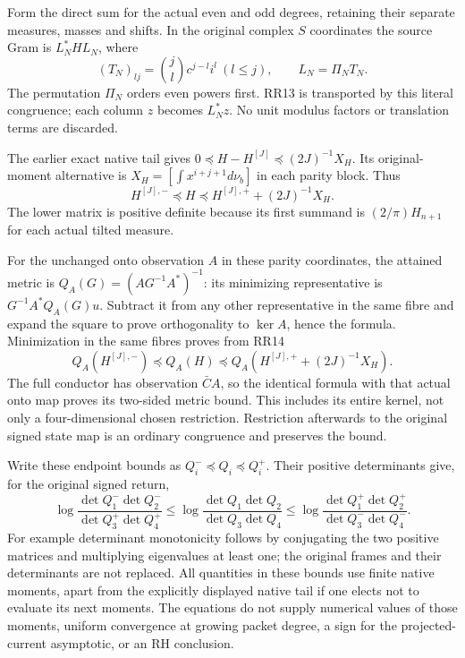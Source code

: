\documentclass[11pt]{article}
\begin{document}
Form the direct sum for the actual even and odd degrees, retaining
their separate measures, masses and shifts. In the original complex
$S$ coordinates the source Gram is $L_N^*HL_N$, where
\[
 (T_N)_{lj}=\binom jl c^{j-l}i^l\ (l\le j),\qquad
 L_N=\Pi_NT_N.
\]
The permutation $\Pi_N$ orders even powers first. RR13 is transported
by this literal congruence; each column $z$ becomes $L_N^*z$.
No unit modulus factors or translation terms are discarded.

The earlier exact native tail \cite{TR} gives
$0\preceq H-H^{[J]}\preceq(2J)^{-1}X_H$.
Its original-moment alternative is
$X_H=[\int x^{i+j+1}d\nu_b]$ in each parity block. Thus
\begin{equation}\tag{RR14}\label{eq:source}
 H^{[J],-}\preceq H\preceq H^{[J],+}+(2J)^{-1}X_H.
\end{equation}
The lower matrix is positive definite because its first summand
is $(2/\pi)H_{n+1}$ for each actual tilted measure.

For the unchanged onto observation $A$ in these parity coordinates,
the attained metric is $Q_A(G)=(AG^{-1}A^*)^{-1}$: its minimizing
representative is $G^{-1}A^*Q_A(G)u$. Subtract it from any other
representative in the same fibre and expand the square to prove
orthogonality to $\ker A$, hence the formula. Minimization in the
same fibres proves from RR14
\begin{equation}\tag{RR15}\label{eq:quotient}
 Q_A(H^{[J],-})\preceq Q_A(H)
       \preceq Q_A(H^{[J],+}+(2J)^{-1}X_H).
\end{equation}
The full conductor has observation $\bar CA$, so the identical
formula with that actual onto map proves its two-sided metric
bound. This includes its entire kernel, not only a four-dimensional
chosen restriction. Restriction afterwards to the original signed
state map is an ordinary congruence and preserves the bound.

Write these endpoint bounds as $Q_i^-\preceq Q_i\preceq Q_i^+$.
Their positive determinants give, for the original signed return,
\begin{equation}\tag{RR16}\label{eq:endpoints}
 \log\frac{\det Q_1^-\det Q_2^-}{\det Q_3^+\det Q_4^+}
 \le\log\frac{\det Q_1\det Q_2}{\det Q_3\det Q_4}
 \le\log\frac{\det Q_1^+\det Q_2^+}{\det Q_3^-\det Q_4^-}.
\end{equation}
For example determinant monotonicity follows by conjugating the
two positive matrices and multiplying eigenvalues at least one;
the original frames and their determinants are not replaced.
All quantities in these bounds use finite native moments, apart
from the explicitly displayed native tail if one elects not to
evaluate its next moments. The equations do not supply numerical
values of those moments, uniform convergence at growing packet
degree, a sign for the projected-current asymptotic, or an RH conclusion.
\end{document}
